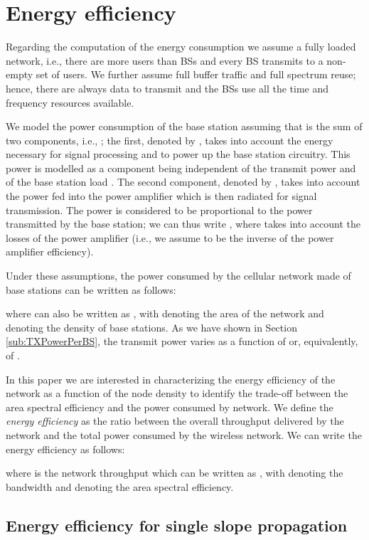 \documentclass[twocoumn]{IEEEtran}
\begin{document}
\section{Energy efficiency} \label{sec:Energy_Efficiency}

Regarding the computation of the energy consumption we assume a fully loaded network, i.e., there are more users than BSs and every BS transmits to a non-empty set of users. We further assume full buffer traffic and full spectrum reuse; hence, there are always data to transmit and the BSs use all the time and frequency resources available.  

We model the power consumption  of the base station
assuming that  is the sum of two components, i.e.,
; the first, denoted by ,
takes into account the energy necessary for signal processing and
to power up the base station circuitry. This power  is modelled
as a component being independent of the transmit power and of the
base station load \cite{Auer2011}. The second component, denoted
by , takes into account the power fed into the power
amplifier which is then radiated for signal transmission. The power
 is considered to be proportional to the power transmitted
by the base station; we can thus write  ,
where  takes into account the losses of the power
amplifier (i.e., we assume  to be the inverse of the power amplifier efficiency). 

Under these assumptions, the power consumed by the cellular network
made of  base stations can be written as follows: 

where  can also be written as , with  denoting the area
of the network and  denoting the density of base stations. As we
have shown in Section \ref{sub:TXPowerPerBS}, the transmit power
 varies as a function of  or, equivalently, of .

In this paper we are interested in characterizing the energy efficiency
of the network as a function of the node density to identify
the trade-off between the area spectral efficiency and the power consumed
by network. We define the \textit{energy efficiency} as the ratio
between the overall throughput delivered by the network and the total
power consumed by the wireless network. We can write the energy efficiency
as follows: 

where  is the network throughput which can be written as ,
with \textbf{} denoting the bandwidth and  denoting the area spectral efficiency.


\subsection{Energy efficiency for single slope propagation} \label{sub:Energy_efficiency_for_LOS}
\end{document}
